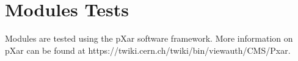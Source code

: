\section{Modules Tests}
\label{s:tests}

Modules are tested using the pXar software framework.  
More information on pXar can be found at https://twiki.cern.ch/twiki/bin/viewauth/CMS/Pxar.




















